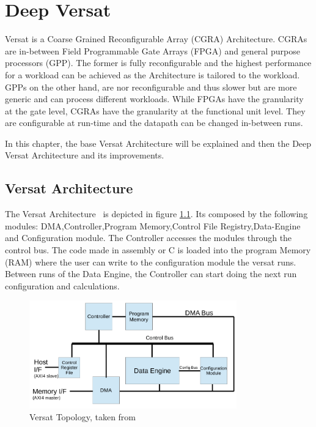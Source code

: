 \chapter{Deep Versat}
\label{chapter:DeepVersat}

\quad Versat is a Coarse Grained Reconfigurable Array (CGRA) Architecture. CGRAs are in-between Field Programmable Gate Arrays (FPGA)
 and general purpose processors (GPP).
The former is fully reconfigurable and the highest performance for a workload can be achieved as the Architecture is tailored to the workload.
GPPs on the other hand, are nor reconfigurable and thus slower but are more generic and can process different workloads.
While FPGAs have the granularity at the gate level, CGRAs have the granularity at the functional unit level. They are configurable at run-time and the datapath can be
changed in-between runs.   

In this chapter, the base Versat Architecture will be explained and then the Deep Versat Architecture
 and its improvements.

\section{Versat Architecture}

\quad The Versat Architecture~\cite{sousa:compiler,sousa:controller,sousa:FFT,sousa:versat2016} 
is depicted in figure \ref{figure:oldversat}. Its composed by the following modules: DMA,Controller,Program Memory,Control File Registry,Data-Engine and Configuration module.
The Controller accesses the modules through the control bus. The code made in assembly or C is loaded into the program Memory (RAM) where the user
can write to the configuration module the versat runs. Between runs of the Data Engine,
 the Controller can start doing the next run configuration and calculations.


\begin{figure}[!htbp]
    \centering
    \includegraphics[width=0.8\textwidth]{Figures/top.png}
    \caption{Versat Topology, taken from~\cite{sousa:controller}}
    \label{figure:oldversat}
\end{figure} 

